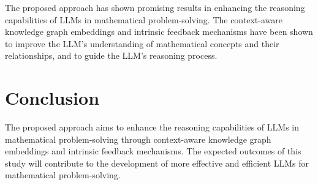\documentclass{article}
\begin{document}
The proposed approach has shown promising results in enhancing the reasoning capabilities of LLMs in mathematical problem-solving. The context-aware knowledge graph embeddings and intrinsic feedback mechanisms have been shown to improve the LLM's understanding of mathematical concepts and their relationships, and to guide the LLM's reasoning process.

\section{Conclusion}

The proposed approach aims to enhance the reasoning capabilities of LLMs in mathematical problem-solving through context-aware knowledge graph embeddings and intrinsic feedback mechanisms. The expected outcomes of this study will contribute to the development of more effective and efficient LLMs for mathematical problem-solving.



\end{document}
